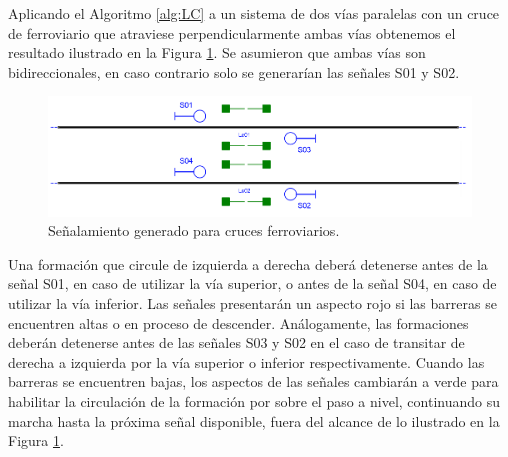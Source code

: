     Aplicando el Algoritmo \ref{alg:LC} a un sistema de dos vías paralelas con un cruce de ferroviario que atraviese perpendicularmente ambas vías obtenemos el resultado ilustrado en la Figura \ref{fig:signal_crossing}. Se asumieron que ambas vías son bidireccionales, en caso contrario solo se generarían las señales S01 y S02.
    
    \begin{figure}[H]
        \centering
        \includegraphics[width=1\textwidth]{Figuras/crossings.PNG}
        \centering\caption{Señalamiento generado para cruces ferroviarios.}
        \label{fig:signal_crossing}
    \end{figure}
    
    Una formación que circule de izquierda a derecha deberá detenerse antes de la señal S01, en caso de utilizar la vía superior, o antes de la señal S04, en caso de utilizar la vía inferior. Las señales presentarán un aspecto rojo si las barreras se encuentren altas o en proceso de descender. Análogamente, las formaciones deberán detenerse antes de las señales S03 y S02 en el caso de transitar de derecha a izquierda por la vía superior o inferior respectivamente. Cuando las barreras se encuentren bajas, los aspectos de las señales cambiarán a verde para habilitar la circulación de la formación por sobre el paso a nivel, continuando su marcha hasta la próxima señal disponible, fuera del alcance de lo ilustrado en la Figura \ref{fig:signal_crossing}.    